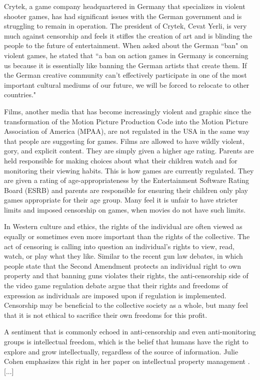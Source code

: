 Crytek, a game company headquartered in Germany that specializes in violent shooter games, has had significant issues with the German government and is struggling to remain in operation. The president of Crytek, Cevat Yerli, is very much against censorship and feels it stifles the creation of art and is blinding the people to the future of entertainment. When asked about the German ``ban" on violent games, he stated that ``a ban on action games in Germany is concerning us because it is essentially like banning the German artists that create them. If the German creative community can't effectively participate in one of the most important cultural mediums of our future, we will be forced to relocate to other countries." \cite{yerli}

Films, another media that has become increasingly violent and graphic since the transformation of the Motion Picture Production Code into the Motion Picture Association of America (MPAA), are not regulated in the USA in the same way that people are suggesting for games. Films are allowed to have wildly violent, gory, and explicit content. They are simply given a higher age rating. Parents are held responsible for making choices about what their children watch and for monitoring their viewing habits. This is how games are currently regulated. They are given a rating of age-appropriateness by the Entertainment Software Rating Board (ESRB) and parents are responsible for ensuring their children only play games appropriate for their age group. Many feel it is unfair to have stricter limits and imposed censorship on games, when movies do not have such limits.

In Western culture and ethics, the rights of the individual are often viewed as equally or sometimes even more important than the rights of the collective. The act of censoring is calling into question an individual's rights to view, read, watch, or play what they like. Similar to the recent gun law debates, in which people state that the Second Amendment protects an individual right to own property and that banning guns violates their rights, the anti-censorship side of the video game regulation debate argue that their rights and freedoms of expression as individuals are imposed upon if regulation is implemented. Censorship may be beneficial to the collective society as a whole, but many feel that it is not ethical to sacrifice their own freedoms for this profit. 

A sentiment that is commonly echoed in anti-censorship and even anti-monitoring groups is intellectual freedom, which is the belief that humans have the right to explore and grow intellectually, regardless of the source of information. Julie Cohen emphasizes this right in her paper on intellectual property management \cite{cohen1995}. [...]

